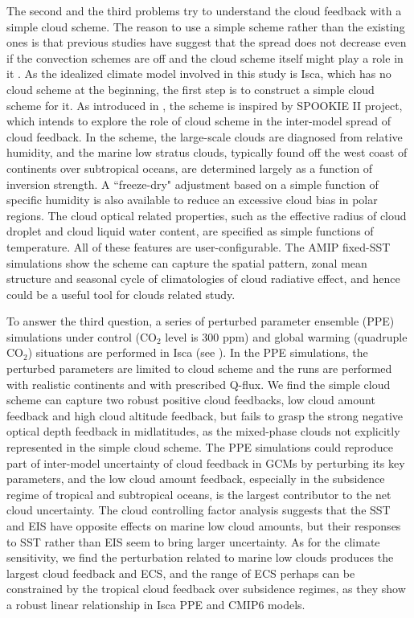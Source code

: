 The second and the third problems try to understand the cloud feedback with a simple cloud scheme. The reason to use a simple scheme rather than the existing ones is that previous studies have suggest that the spread does not decrease even if the convection schemes are off \citep{Webb2015} and the cloud scheme itself might play a role in it \citep[e.g.,][]{Qu2014,Geoffroy2017}. As the idealized climate model involved in this study is Isca, which has no cloud scheme at the beginning, the first step is to construct a simple cloud scheme for it. As introduced in , the scheme \citep{Liu2021simcloud} is inspired by SPOOKIE II project, which intends to explore the role of cloud scheme in the inter-model spread of cloud feedback. In the scheme, the large-scale clouds are diagnosed from relative humidity, and the marine low stratus clouds, typically found off the west coast of continents over subtropical oceans, are determined largely as a function of inversion strength. A ``freeze-dry" adjustment based on a simple function of specific humidity is also available to reduce an excessive cloud bias in polar regions. The cloud optical related properties, such as the effective radius of cloud droplet and cloud liquid water content, are specified as simple functions of temperature. All of these features are user-configurable. The AMIP fixed-SST simulations show the scheme can capture the spatial pattern, zonal mean structure and seasonal cycle of climatologies of cloud radiative effect, and hence could be a useful tool for clouds related study. 

To answer the third question, a series of perturbed parameter ensemble (PPE) simulations under control (CO$_2$ level is 300 ppm) and global warming (quadruple CO$_2$) situations are performed in Isca (see ). In the PPE simulations, the perturbed parameters are limited to cloud scheme and the runs are performed with realistic continents and with prescribed Q-flux. We find the simple cloud scheme can capture two robust positive cloud feedbacks, low cloud amount feedback and high cloud altitude feedback, but fails to grasp the strong negative optical depth feedback in midlatitudes, as the mixed-phase clouds not explicitly represented in the simple cloud scheme. The PPE simulations could reproduce part of inter-model uncertainty of cloud feedback in GCMs by perturbing its key parameters, and the low cloud amount feedback, especially in the subsidence regime of tropical and subtropical oceans, is the largest contributor to the net cloud uncertainty. The cloud controlling factor analysis suggests that the SST and EIS have opposite effects on marine low cloud amounts, but their responses to SST rather than EIS seem to bring larger uncertainty. As for the climate sensitivity, we find the perturbation related to marine low clouds produces the largest cloud feedback and ECS, and the range of ECS perhaps can be constrained by the tropical cloud feedback over subsidence regimes, as they show a robust linear relationship in Isca PPE and CMIP6 models.

